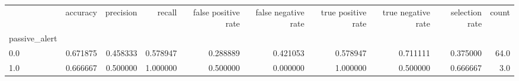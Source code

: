 \begin{tabular}{lrrrrrrrrr}
\toprule
{} &  accuracy &  precision &    recall &  false positive rate &  false negative rate &  true positive rate &  true negative rate &  selection rate &  count \\
passive\_alert &           &            &           &                      &                      &                     &                     &                 &        \\
\midrule
0.0           &  0.671875 &   0.458333 &  0.578947 &             0.288889 &             0.421053 &            0.578947 &            0.711111 &        0.375000 &   64.0 \\
1.0           &  0.666667 &   0.500000 &  1.000000 &             0.500000 &             0.000000 &            1.000000 &            0.500000 &        0.666667 &    3.0 \\
\bottomrule
\end{tabular}
